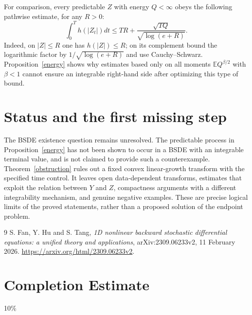\documentclass[11pt]{article}
\newcommand{\E}{\mathbb E}
\begin{document}
For comparison, every predictable $Z$ with energy $Q<\infty$ obeys
the following pathwise estimate, for any $R>0$:
\begin{equation}\label{split}
 \int_0^T h(|Z_t|)dt
 \leq TR+\frac{\sqrt{TQ}}{\sqrt{\log(e+R)}}.
\end{equation}
Indeed, on $|Z|\leq R$ one has $h(|Z|)\leq R$; on its complement
bound the logarithmic factor by $1/\sqrt{\log(e+R)}$ and use
Cauchy--Schwarz. Proposition~\ref{energy} shows why estimates based
only on all moments $\E Q^{\beta/2}$ with $\beta<1$ cannot ensure
an integrable right-hand side after optimizing this type of bound.

\section{Status and the first missing step}
The BSDE existence question remains unresolved. The predictable process
in Proposition~\ref{energy} has not been shown to occur in a BSDE with
an integrable terminal value, and is not claimed to provide such a
counterexample. Theorem~\ref{obstruction} rules out a fixed convex
linear-growth transform with the specified time control. It leaves open
data-dependent transforms, estimates that exploit the relation between
$Y$ and $Z$, compactness arguments with a different integrability mechanism,
and genuine negative examples. These are precise logical limits of the
proved statements, rather than a proposed solution of the endpoint problem.

\begin{thebibliography}{9}
 S. Fan, Y. Hu and S. Tang,
\emph{1D nonlinear backward stochastic differential equations: a unified theory and applications}, arXiv:2309.06233v2, 11 February 2026.
\url{https://arxiv.org/html/2309.06233v2}.
\end{thebibliography}
\section{Completion Estimate}
10\%
\end{document}
